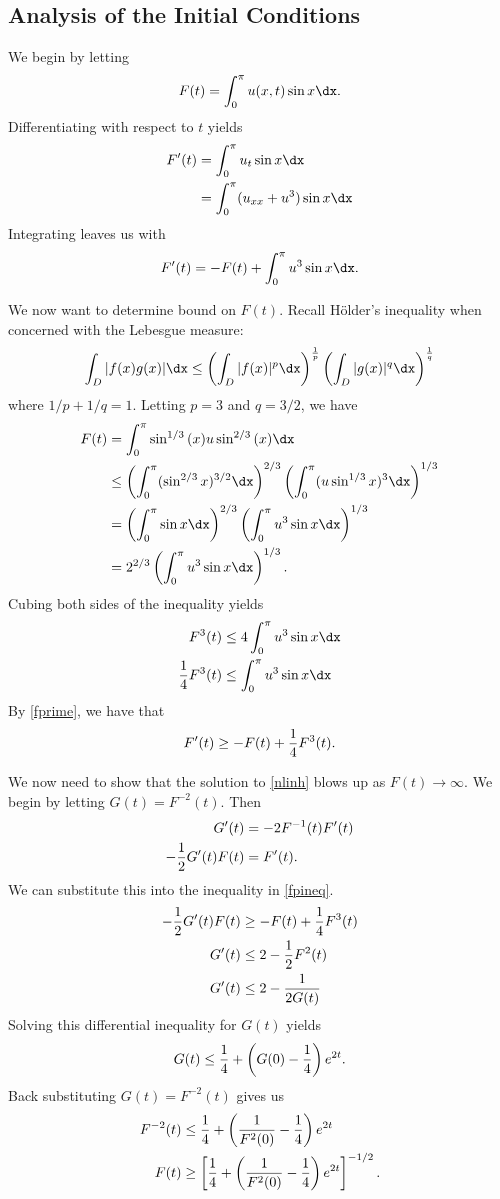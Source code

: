 \documentclass{hw}
\begin{document}
\subsection{Analysis of the Initial Conditions}
We begin by letting
\[
F(t)=\int_{0}^{\pi}u(x,t)\sin{x}\dx.
\]
Differentiating with respect to $t$ yields
\begin{align*}
F'(t)&=\int_{0}^{\pi}u_{t}\sin{x}\dx\\
&=\int_{0}^{\pi}(u_{xx}+u^{3})\sin{x}\dx
\end{align*}
Integrating leaves us with
\begin{equation}\label{fprime}
F'(t)=-F(t)+\int_{0}^{\pi}u^{3}\sin{x}\dx.
\end{equation}

We now want to determine bound on $F(t)$. Recall H\"older's inequality when concerned with the
Lebesgue measure:
\[
\int_{D}|f(x)g(x)|\dx\leq
\left(\int_{D}|f(x)|^{p}\dx\right)^{1\over p}
\left(\int_{D}|g(x)|^{q}\dx\right)^{1\over q}
\]
where $1/p + 1/q=1$. Letting $p=3$ and $q=3/2$, we have
\begin{align*}
F(t)&=\int_{0}^{\pi}\sin^{1/3}{(x)}u\sin^{2/3}{(x)}\dx\\
&\leq
\left(\int_{0}^{\pi}(\sin^{2/3}{x})^{3/2}\dx\right)^{2/3}
\left(\int_{0}^{\pi}(u\sin^{1/3}{x})^{3}\dx\right)^{1/3}\\
&=\left(\int_{0}^{\pi}\sin{x}\dx\right)^{2/3}
\left(\int_{0}^{\pi}u^{3}\sin{x}\dx\right)^{1/3}\\
&= 2^{2/3}\left(\int_{0}^{\pi}u^{3}\sin{x}\dx\right)^{1/3}.
\end{align*}
Cubing both sides of the inequality yields
\begin{align*}
F^{3}(t)&\leq4\int_{0}^{\pi}u^{3}\sin{x}\dx\\
{1\over4}F^{3}(t)&\leq\int_{0}^{\pi}u^{3}\sin{x}\dx\\
\end{align*}
By \eqref{fprime}, we have that
\begin{equation}\label{fpineq}
F'(t)\geq-F(t)+{1\over4}F^{3}(t).
\end{equation}

We now need to show that the solution to \eqref{nlinh} blows up as $F(t)\to\infty$. We begin by
letting $G(t) = F^{-2}(t)$. Then
\begin{align*}
G'(t)&=-2F^{-1}(t)F'(t)\\
-{1\over2}G'(t)F(t)&=F'(t).
\end{align*}
We can substitute this into the inequality in \eqref{fpineq}.
\begin{align*}
-{1\over2}G'(t)F(t)&\geq-F(t)+{1\over4}F^{3}(t)\\
G'(t)&\leq2-{1\over2}F^{2}(t)\\
G'(t)&\leq2-{1\over2G(t)} %
\end{align*}
Solving this differential inequality for $G(t)$ yields
\[
G(t)\leq{1\over4}+\left(G(0)-{1\over4}\right)e^{2t}.
\]
Back substituting $G(t)=F^{-2}(t)$ gives us
\begin{align}
F^{-2}(t)&\leq{1\over4}+\left({1\over F^{2}(0)}-{1\over4}\right)e^{2t}\\
F(t)&\geq\left[{1\over4}+\left({1\over F^{2}(0)}-{1\over4}\right)e^{2t}\right]^{-1/2}\label{final_ineq}.
\end{align}
\end{document}
